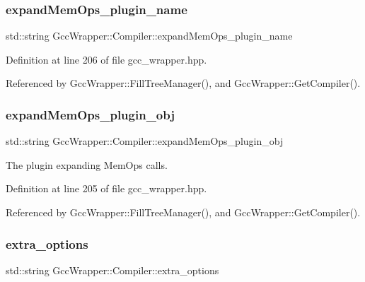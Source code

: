 \subsubsection{\texorpdfstring{expand\+Mem\+Ops\+\_\+plugin\+\_\+name}{expandMemOps\_plugin\_name}}
{\footnotesize\ttfamily std\+::string Gcc\+Wrapper\+::\+Compiler\+::expand\+Mem\+Ops\+\_\+plugin\+\_\+name}



Definition at line 206 of file gcc\+\_\+wrapper.\+hpp.



Referenced by Gcc\+Wrapper\+::\+Fill\+Tree\+Manager(), and Gcc\+Wrapper\+::\+Get\+Compiler().

\mbox{\label{classGccWrapper_1_1Compiler_a1a5fa1148e0c375a654405e8987c4965}} 
\subsubsection{\texorpdfstring{expand\+Mem\+Ops\+\_\+plugin\+\_\+obj}{expandMemOps\_plugin\_obj}}
{\footnotesize\ttfamily std\+::string Gcc\+Wrapper\+::\+Compiler\+::expand\+Mem\+Ops\+\_\+plugin\+\_\+obj}



The plugin expanding Mem\+Ops calls. 



Definition at line 205 of file gcc\+\_\+wrapper.\+hpp.



Referenced by Gcc\+Wrapper\+::\+Fill\+Tree\+Manager(), and Gcc\+Wrapper\+::\+Get\+Compiler().

\mbox{\label{classGccWrapper_1_1Compiler_abeafe5252ef30150b5cbf498fc9b160a}} 
\subsubsection{\texorpdfstring{extra\+\_\+options}{extra\_options}}
{\footnotesize\ttfamily std\+::string Gcc\+Wrapper\+::\+Compiler\+::extra\+\_\+options}



